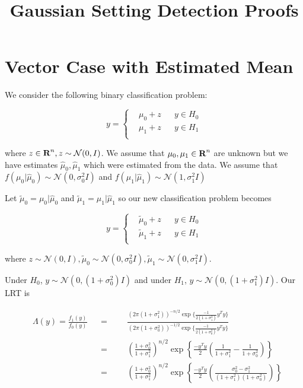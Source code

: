 \documentclass[english]{article}
\title{Gaussian Setting Detection Proofs}
\begin{document}
\maketitle

\section*{Vector Case with Estimated Mean}

We consider the following binary classification problem:

\begin{equation}
y=\left\{
\begin{aligned}
&\mu_0+z
&& y\in H_0\\
&\mu_1+z
&& y\in H_1\\
\end{aligned}\right.
\end{equation}

where $z\in{\mbox{\bf R}}^n, z\sim\mathcal{N}(0,I)$. We assume that $\mu_0,\mu_1\in{\mbox{\bf R}}^n$ are unknown but we have estimates $\hat{\mu}_0, \hat{\mu}_1$ which were estimated from the data. We assume that $f(\mu_0|\hat{\mu}_0)\sim\mathcal{N}(0,\sigma_0^2I)$ and $f(\mu_1|\hat{\mu}_1)\sim\mathcal{N}(1,\sigma_1^2I)$

Let $\tilde{\mu}_0=\mu_0|\hat{\mu}_0$ and $\tilde{\mu}_1=\mu_1|\hat{\mu}_1$ so our new classification problem becomes

\begin{equation}\label{eq:y dist}
y=\left\{
\begin{aligned}
&\tilde{\mu}_0+z
&& y\in H_0\\
&\tilde{\mu}_1+z
&& y\in H_1\\
\end{aligned}\right.
\end{equation}

where $z\sim\mathcal{N}(0,I), \tilde{\mu}_0\sim\mathcal{N}(0,\sigma_0^2I),\tilde{\mu}_1\sim\mathcal{N}(0,\sigma_1^2I)$.

Under $H_0$, $y\sim\mathcal{N}(0,(1+\sigma_0^2)I)$ and under $H_1$, $y\sim\mathcal{N}(0,(1+\sigma_1^2)I)$. Our LRT is

\begin{equation}
\begin{aligned}
&\Lambda(y)=\frac{f_1(y)}{f_0(y)}
&&=
&&&\frac{(2\pi(1+\sigma_1^2))^{-n/2}\exp\{\frac{-1}{2(1+\sigma_1^2)}y^Ty\}}{(2\pi(1+\sigma_0^2))^{-1/2}\exp\{\frac{-1}{2(1+\sigma_0^2)}y^Ty\}}\\
&&&=
&&&\left(\frac{1+\sigma_0^2}{1+\sigma_1^2}\right) ^{n/2}\exp\left\{\frac{-y^Ty}{2}\left(\frac{1}{1+\sigma_1^2}-\frac{1}{1+\sigma_0^2}\right)\right\}\\
&&&=
&&&\left(\frac{1+\sigma_0^2}{1+\sigma_1^2}\right) ^{n/2}\exp\left\{\frac{-y^Ty}{2}\left(\frac{\sigma_0^2-\sigma_1^2}{(1+\sigma_1^2)(1+\sigma_0^2)}\right)\right\}\\
\end{aligned}
\end{equation}
\end{document}
